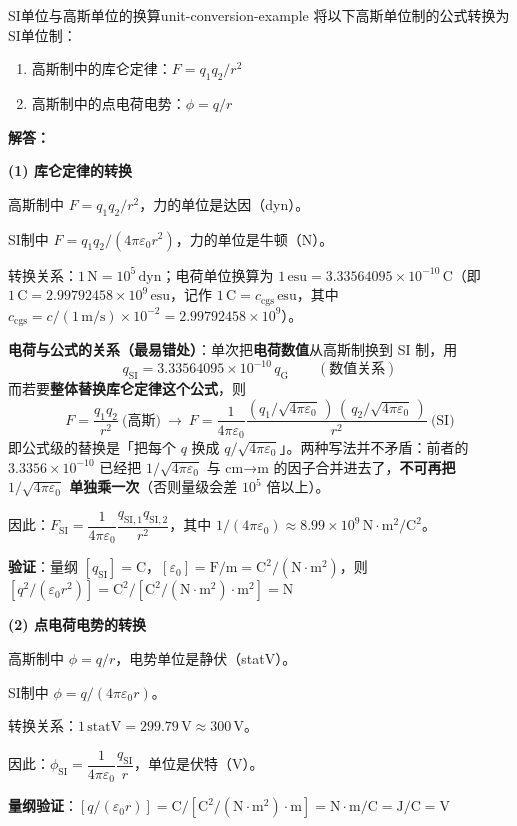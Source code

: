 \documentclass[11pt,a4paper,openany,oneside]{book}
\newcommand{\eps}{\varepsilon}
\newcommand{\difficulty}[1]{\marginnote{\textcolor{red}{\textbf{[#1]}}}}
\begin{document}
\begin{example}{SI单位与高斯单位的换算}{unit-conversion-example}
\difficulty{基础}
将以下高斯单位制的公式转换为SI单位制：
\begin{enumerate}[label=(\arabic*)]
\item 高斯制中的库仑定律：$F = q_1 q_2 / r^2$
\item 高斯制中的点电荷电势：$\phi = q/r$
\end{enumerate}
\tcblower
\textbf{解答：}

\textbf{(1) 库仑定律的转换}

高斯制中 $F = q_1 q_2 / r^2$，力的单位是达因（dyn）。

SI制中 $F = q_1 q_2 / (4\pi\eps_0 r^2)$，力的单位是牛顿（N）。

转换关系：$1\,\text{N} = 10^5\,\text{dyn}$；电荷单位换算为 $1\,\text{esu} = 3.33564095\times 10^{-10}\,\text{C}$（即 $1\,\text{C} = 2.99792458\times 10^{9}\,\text{esu}$，记作 $1\,\text{C} = c_{\text{cgs}}\,\text{esu}$，其中 $c_{\text{cgs}} = c/(1\,\text{m/s})\times 10^{-2} = 2.99792458\times10^{9}$）。

\textbf{电荷与公式的关系（最易错处）}：单次把\textbf{电荷数值}从高斯制换到 SI 制，用
\[
q_{\text{SI}} = 3.33564095\times 10^{-10}\,q_{\text{G}}\qquad(\text{数值关系})
\]
而若要\textbf{整体替换库仑定律这个公式}，则
\[
F = \frac{q_1 q_2}{r^2}\ \text{(高斯)}\ \longrightarrow\ F = \frac{1}{4\pi\eps_0}\frac{(q_1/\sqrt{4\pi\eps_0}\,)\,(\,q_2/\sqrt{4\pi\eps_0}\,)}{r^2}\ \text{(SI)}
\]
即公式级的替换是「把每个 $q$ 换成 $q/\sqrt{4\pi\eps_0}$」。两种写法并不矛盾：前者的 $3.3356\times10^{-10}$ 已经把 $1/\sqrt{4\pi\eps_0}$ 与 cm→m 的因子合并进去了，\textbf{不可再把 $1/\sqrt{4\pi\eps_0}$ 单独乘一次}（否则量级会差 $10^{5}$ 倍以上）。

因此：$F_{\text{SI}} = \dfrac{1}{4\pi\eps_0}\dfrac{q_{\text{SI},1}q_{\text{SI},2}}{r^2}$，其中 $1/(4\pi\eps_0) \approx 8.99\times 10^9\,\text{N}\cdot\text{m}^2/\text{C}^2$。

\textbf{验证}：量纲 $[q_{\text{SI}}] = \text{C}$，$[\eps_0] = \text{F/m} = \text{C}^2/(\text{N}\cdot\text{m}^2)$，则 $[q^2/(\eps_0 r^2)] = \text{C}^2/[\text{C}^2/(\text{N}\cdot\text{m}^2)\cdot\text{m}^2] = \text{N}$ \checkmark

\textbf{(2) 点电荷电势的转换}

高斯制中 $\phi = q/r$，电势单位是静伏（statV）。

SI制中 $\phi = q/(4\pi\eps_0 r)$。

转换关系：$1\,\text{statV} = 299.79\,\text{V} \approx 300\,\text{V}$。

因此：$\phi_{\text{SI}} = \dfrac{1}{4\pi\eps_0}\dfrac{q_{\text{SI}}}{r}$，单位是伏特（V）。

\textbf{量纲验证}：$[q/(\eps_0 r)] = \text{C}/[\text{C}^2/(\text{N}\cdot\text{m}^2)\cdot\text{m}] = \text{N}\cdot\text{m}/\text{C} = \text{J}/\text{C} = \text{V}$ \checkmark
\end{example}
\end{document}
